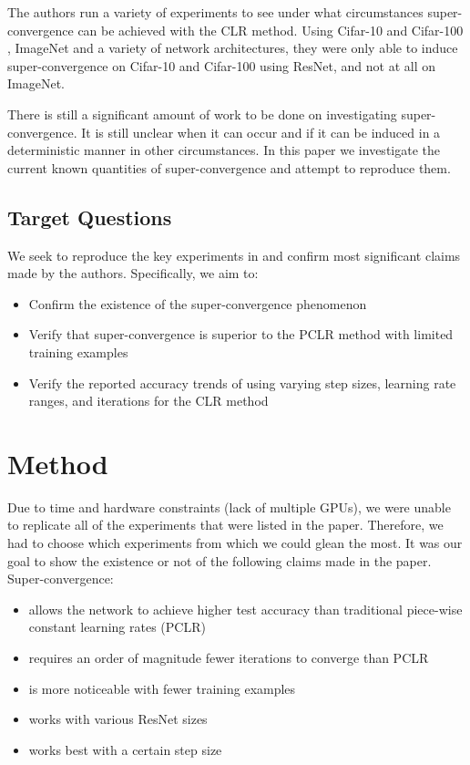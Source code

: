 \documentclass[10pt,twocolumn,letterpaper]{article}
\begin{document}
The authors run a variety of experiments to see under what circumstances
super-convergence can be achieved with the CLR method. Using Cifar-10 and
Cifar-100 \cite{Cifar}, ImageNet \cite{ImageNet} and a variety of network
architectures, they were only able to induce super-convergence on Cifar-10 and
Cifar-100 using ResNet, and not at all on ImageNet.

There is still a significant amount of work to be done on investigating
super-convergence. It is still unclear when it can occur and if it can be
induced in a deterministic manner in other circumstances. In this paper we
investigate the current known quantities of super-convergence and attempt to
reproduce them.

\subsection{Target Questions}
We seek to reproduce the key experiments in \cite{SuperConvergence} and confirm
most significant claims made by the authors. Specifically, we aim to:
\begin{itemize}
    \item Confirm the existence of the super-convergence phenomenon
    \item Verify that super-convergence is superior to the PCLR method with
        limited training examples
    \item Verify the reported accuracy trends of using varying step sizes,
        learning rate ranges, and iterations for the CLR method
\end{itemize}

\section{Method}
\label{sec:method}
Due to time and hardware constraints (lack of multiple GPUs), we were unable to
replicate all of the experiments that were listed in the paper. Therefore, we
had to choose which experiments from which we could glean the most. It was our
goal to show the existence or not of the following claims made in the paper.
Super-convergence:
\begin{itemize}
    \item allows the network to achieve higher test accuracy than traditional
        piece-wise constant learning rates (PCLR)
    \item requires an order of magnitude fewer iterations to converge than PCLR
    \item is more noticeable with fewer training examples
    \item works with various ResNet sizes
    \item works best with a certain step size
\end{itemize}
\end{document}
